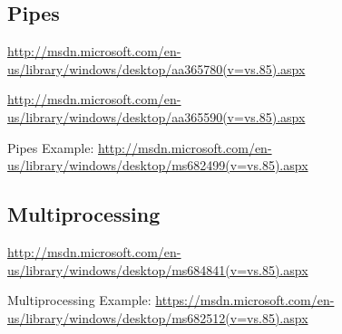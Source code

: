 \documentclass[letterpaper,10pt]{article}
\begin{document}
\subsection{Pipes}
\url{http://msdn.microsoft.com/en-us/library/windows/desktop/aa365780(v=vs.85).aspx}

\url{http://msdn.microsoft.com/en-us/library/windows/desktop/aa365590(v=vs.85).aspx}

Pipes Example: \url{http://msdn.microsoft.com/en-us/library/windows/desktop/ms682499(v=vs.85).aspx}

\subsection{Multiprocessing}
\url{http://msdn.microsoft.com/en-us/library/windows/desktop/ms684841(v=vs.85).aspx}

Multiprocessing Example: \url{https://msdn.microsoft.com/en-us/library/windows/desktop/ms682512(v=vs.85).aspx}
\end{document}
